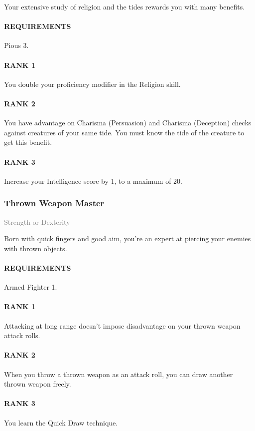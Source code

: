 \normalsize
Your extensive study of religion and the tides rewards you with many benefits.
\paragraph{REQUIREMENTS} Pious 3.
\paragraph{RANK 1} You double your proficiency modifier in the Religion skill.
\paragraph{RANK 2} You have advantage on Charisma (Persuasion) and Charisma (Deception) checks against creatures of your same tide.
You must know the tide of the creature to get this benefit.
\paragraph{RANK 3} Increase your Intelligence score by 1, to a maximum of 20.

\subsubsection{Thrown Weapon Master} \label{feat::thrownweaponmaster}
\small{\textcolor{gray}{Strength or Dexterity}}

\normalsize
Born with quick fingers and good aim, you're an expert at piercing your enemies with thrown objects.
\paragraph{REQUIREMENTS} Armed Fighter 1.
\paragraph{RANK 1} Attacking at long range doesn't impose disadvantage on your thrown weapon attack rolls.
\paragraph{RANK 2} When you throw a thrown weapon as an attack roll, you can draw another thrown weapon freely.
\paragraph{RANK 3} You learn the Quick Draw technique.

